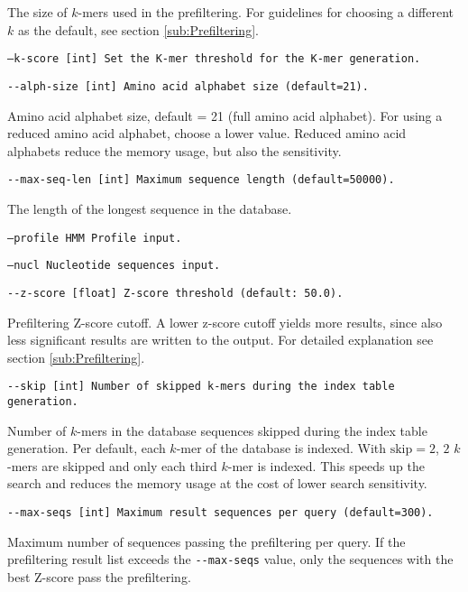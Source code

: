 \documentclass[11pt,a4paper]{report}
\begin{document}
The size of $k$-mers used in the prefiltering. For guidelines for
choosing a different $k$ as the default, see section \ref{sub:Prefiltering}.

\texttt{\small --k-score {[}int{]}  Set the K-mer threshold for the K-mer generation.}{\small \par}


\texttt{\small -{}-alph-size {[}int{]} Amino acid alphabet size (default=21).}{\small \par}

Amino acid alphabet size, default = 21 (full amino acid alphabet).
For using a reduced amino acid alphabet, choose a lower value. Reduced
amino acid alphabets reduce the memory usage, but also the sensitivity.

\texttt{\small -{}-max-seq-len {[}int{]} Maximum sequence length (default=50000).}{\small \par}

The length of the longest sequence in the database.

\texttt{\small --profile HMM Profile input.}{\small \par}


\texttt{\small --nucl Nucleotide sequences input.}{\small \par}

\texttt{\small -{}-z-score {[}float{]} Z-score threshold (default: 50.0).}{\small \par}

Prefiltering Z-score cutoff. A lower z-score cutoff yields more results,
since also less significant results are written to the output. For
detailed explanation see section \ref{sub:Prefiltering}.

\texttt{\small -{}-skip {[}int{]} Number of skipped k-mers during
the index table generation.}{\small \par}

Number of $k$-mers in the database sequences skipped during the index
table generation. Per default, each $k$-mer of the database is indexed.
With $\mathrm{skip}=2$, $2$ $k$-mers are skipped and only each
third $k$-mer is indexed. This speeds up the search and reduces the
memory usage at the cost of lower search sensitivity.

\texttt{\small -{}-max-seqs {[}int{]} Maximum result sequences per
query (default=300).}{\small \par}

Maximum number of sequences passing the prefiltering per query. If
the prefiltering result list exceeds the \texttt{-{}-max-seqs} value,
only the sequences with the best Z-score pass the prefiltering.
\end{document}
